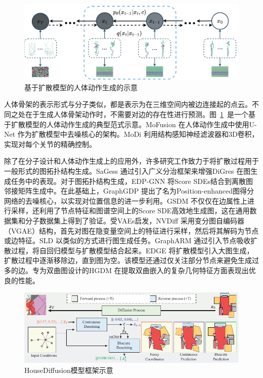 \begin{figure}[h]
  \centering
  \includegraphics[width=\linewidth]{figures/modiff.png}
  \caption{基于扩散模型的人体动作生成的示意 \cite{modiff_zhao_23}}
  \label{fig:modiff}
\end{figure}

人体骨架的表示形式与分子类似，都是表示为在三维空间内被边连接起的点云。不同之处在于生成人体骨架动作时，不需要对边的存在性进行预测。图~\ref{fig:modiff}~是一个基于扩散模型的人体动作生成的典型范式示意。MoFusion \cite{mofusion_dabral_22}在人体动作生成中使用U-Net \cite{unet_ronneberger_15}作为扩散模型中去噪核心的架构。MoDi \cite{modi_raab_22} 利用结构感知神经滤波器和3D卷积，实现对每个关节的精确控制。

除了在分子设计和人体动作生成上的应用外，许多研究工作致力于将扩散过程用于一般形式的图拓扑结构生成。SaGess \cite{sagess_limnios_23}通过引入广义分治框架来增强DiGres \cite{digress_vignac_22}在图生成任务中的表现。对于图拓扑结构生成，EDP-GNN \cite{edpgnn_niu_20}将Score SDEs结合到离散图邻接矩阵生成中。在此基础上，GraphGDP \cite{graphgdp_huang_22}提出了名为Position-enhanced图得分网络的去噪核心，以实现对位置信息的进一步利用。GSDM \cite{gsdm_luo_22}不仅仅在边属性上进行采样，还利用了节点特征和图谱空间上的Score SDE高效地生成图，这在通用数据集和分子数据集上得到了验证。受VAEs启发，NVDiff \cite{nvdiff_chen_22}采用变分图自编码器（VGAE）结构，首先对图在隐变量空间上的特征进行采样，然后将其解码为节点或边特征。SLD \cite{sld_yang_23}以类似的方式进行图生成任务。GraphARM \cite{ardiff_kong_23}通过引入节点吸收扩散过程，将自回归模型与扩散模型结合起来。EDGE \cite{edge_chen_23}将扩散模型引入大图生成，扩散过程中逐渐移除边，直到图为空。该模型还通过仅关注部分节点来避免生成过多的边。专为双曲图设计的HGDM \cite{hgdm_wen_23}在提取双曲嵌入的复杂几何特征方面表现出优良的性能。

\begin{figure}[h]
  \centering
  \includegraphics[width=1.0\linewidth]{figures/housediffusion.pdf}
  \caption{HouseDiffusion模型框架示意 \cite{housediffusion_shabani_23}}
  \label{fig:housediffusion}
\end{figure}

